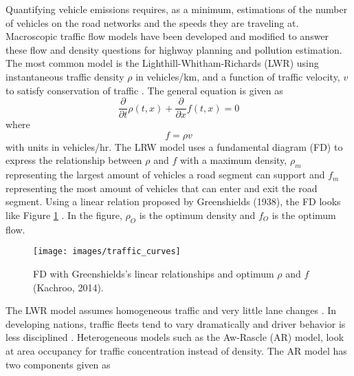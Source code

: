 \documentclass[preprint,12pt,a4paper,authoryear]{elsarticle}
\begin{document}
\begin{linenumbers}
Quantifying vehicle emissions requires, as a minimum, estimations of the number of vehicles on the road networks and the speeds they are traveling at. Macroscopic traffic flow models have been developed and modified to answer these flow and density questions for highway planning and pollution estimation. The most common model is the Lighthill-Whitham-Richards (LWR) using instantaneous traffic density $\rho$ in vehicles/km, and a function of traffic velocity, $v$ to satisfy conservation of traffic \citep{Lighthill1955}. The general equation is given as
%
\begin{equation}
\label{eq:LRW}
\frac{\partial }{\partial t}\rho \left ( t,x \right )+\frac{\partial }{\partial x}f \left ( t,x \right )=0
\end{equation}	
%
where
%
\begin{equation}
\label{eq:trafficflow}
f = \rho v
\end{equation}	
%
\noindent
with units in vehicles/hr. The LRW model uses a fundamental diagram (FD) to express the relationship between $\rho$ and  $f$ with a maximum density, $\rho_{m}$ representing the largest amount of vehicles a road segment can support and $f_{m}$ representing the most amount of vehicles that can enter and exit the road segment. Using a linear relation proposed by Greenshields (1938), the FD looks like Figure \ref{fig:LRW-FD} \citep{Greenshields1935}. In the figure, $\rho_{O}$ is the optimum density and $f_{O}$ is the optimum flow.
%
\begin{figure}[H]
\centering
\texttt{[image: images/traffic\_curves]}  %
\caption[Fundamental diagram with Greenshields's linear relationships and optimum $\rho$ and $f$]{FD with Greenshields's linear relationships and optimum $\rho$ and $f$ (Kachroo, 2014).}
\label{fig:LRW-FD}
\end{figure}
%
The LWR model assumes homogeneous traffic and very little lane changes \citep{Kachroo2014}. In developing nations, traffic fleets tend to vary dramatically and driver behavior is less disciplined \citep{Mohan2013}. Heterogeneous models such as the Aw-Rascle (AR) model, look at area occupancy for traffic concentration instead of density. The AR model has two components given as 


\end{linenumbers}
\end{document}
